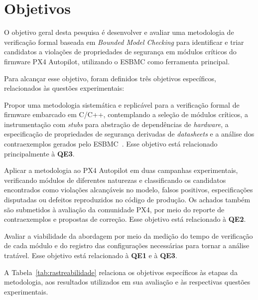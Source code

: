 \section{Objetivos}
\label{sec:objetivos}

O objetivo geral desta pesquisa é desenvolver e avaliar uma metodologia de verificação formal baseada em \textit{Bounded Model Checking} para identificar e triar candidatos a violações de propriedades de segurança em módulos críticos do firmware PX4 Autopilot, utilizando o ESBMC como ferramenta principal.

Para alcançar esse objetivo, foram definidos três objetivos específicos, relacionados às questões experimentais:

\begin{description}[leftmargin=1.5cm, style=nextline, font=\normalfont\bfseries]

\item[O1] Propor uma metodologia sistemática e replicável para a verificação formal de firmware embarcado em C/C++, contemplando a seleção de módulos críticos, a instrumentação com \textit{stubs} para abstração de dependências de \textit{hardware}, a especificação de propriedades de segurança derivadas de \textit{datasheets} e a análise dos contraexemplos gerados pelo ESBMC~\cite{Cordeiro2012}. Esse objetivo está relacionado principalmente à \textbf{QE3}.

\item[O2] Aplicar a metodologia ao PX4 Autopilot em duas campanhas experimentais, verificando módulos de diferentes naturezas e classificando os candidatos encontrados como violações alcançáveis no modelo, falsos positivos, especificações disputadas ou defeitos reproduzidos no código de produção. Os achados também são submetidos à avaliação da comunidade PX4, por meio do reporte de contraexemplos e propostas de correção. Esse objetivo está relacionado à \textbf{QE2}.

\item[O3] Avaliar a viabilidade da abordagem por meio da medição do tempo de verificação de cada módulo e do registro das configurações necessárias para tornar a análise tratável. Esse objetivo está relacionado à \textbf{QE1} e à \textbf{QE3}.

\end{description}

A Tabela~\ref{tab:rastreabilidade} relaciona os objetivos específicos às etapas da metodologia, aos resultados utilizados em sua avaliação e às respectivas questões experimentais.

